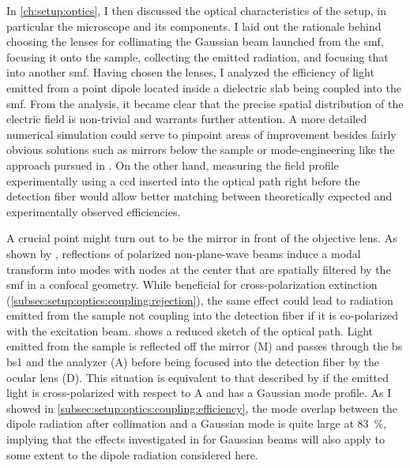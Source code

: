 In \cref{ch:setup:optics}, I then discussed the optical characteristics of the setup, in particular the microscope and its components.
I laid out the rationale behind choosing the lenses for collimating the Gaussian beam launched from the \gls{smf}, focusing it onto the sample, collecting the emitted radiation, and focusing that into another \gls{smf}.
Having chosen the lenses, I analyzed the efficiency of light emitted from a point dipole located inside a dielectric slab being coupled into the \gls{smf}.
From the analysis, it became clear that the precise spatial distribution of the electric field is non-trivial and warrants further attention.
A more detailed numerical simulation could serve to pinpoint areas of improvement besides fairly obvious solutions such as mirrors below the sample or mode-engineering like the approach pursued in .
On the other hand, measuring the field profile experimentally using a \gls{ccd} inserted into the optical path right before the detection fiber would allow better matching between theoretically expected and experimentally observed efficiencies.

A crucial point might turn out to be the mirror in front of the objective lens.
As shown by \textcite{Benelajla2021}, reflections of polarized non-plane-wave beams induce a modal transform into modes with nodes at the center that are spatially filtered by the \gls{smf} in a confocal geometry.
While beneficial for cross-polarization extinction (\cf \cref{subsec:setup:optics:coupling:rejection}), the same effect could lead to radiation emitted from the sample not coupling into the detection fiber if it is co-polarized with the excitation beam.
 shows a reduced sketch of the optical path.
Light emitted from the sample is reflected off the mirror (M) and passes through the \acrlong{bs} \acrshort{bs}1 and the analyzer (A) before being focused into the detection fiber by the ocular lens (D).
This situation is equivalent to that described by \textcite{Benelajla2021} if the emitted light is cross-polarized with respect to A and has a Gaussian mode profile.
As I showed in \cref{subsec:setup:optics:coupling:efficiency}, the mode overlap between the dipole radiation after collimation and a Gaussian  mode is quite large at \qty{83}{\percent}, implying that the effects investigated in  for Gaussian beams will also apply to some extent to the dipole radiation considered here.

